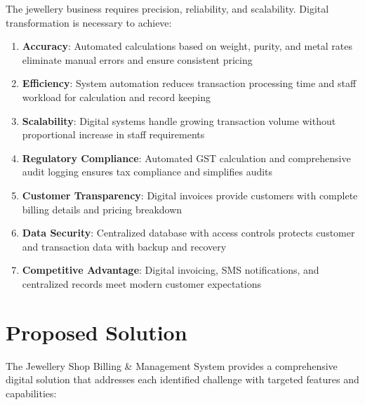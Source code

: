 \documentclass[12pt,a4paper]{report}
\begin{document}
The jewellery business requires precision, reliability, and scalability. Digital transformation is necessary to achieve:

\begin{enumerate}[label=\roman*)]
    \item \textbf{Accuracy}: Automated calculations based on weight, purity, and metal rates eliminate manual errors and ensure consistent pricing
    \item \textbf{Efficiency}: System automation reduces transaction processing time and staff workload for calculation and record keeping
    \item \textbf{Scalability}: Digital systems handle growing transaction volume without proportional increase in staff requirements
    \item \textbf{Regulatory Compliance}: Automated GST calculation and comprehensive audit logging ensures tax compliance and simplifies audits
    \item \textbf{Customer Transparency}: Digital invoices provide customers with complete billing details and pricing breakdown
    \item \textbf{Data Security}: Centralized database with access controls protects customer and transaction data with backup and recovery
    \item \textbf{Competitive Advantage}: Digital invoicing, SMS notifications, and centralized records meet modern customer expectations
\end{enumerate}

\section{Proposed Solution}

The Jewellery Shop Billing \& Management System provides a comprehensive digital solution that addresses each identified challenge with targeted features and capabilities:
\end{document}
